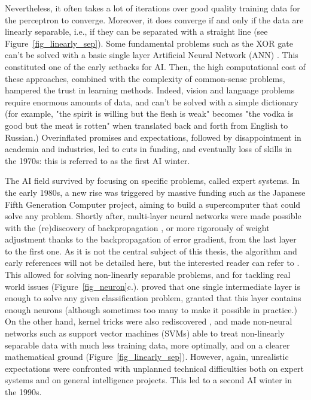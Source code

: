 Nevertheless, it often takes a lot of iterations over good quality training data for the perceptron to converge. Moreover, it does converge if and only if the data are linearly separable, i.e., if they can be separated with a straight line \cite{Novikoff1963} (see Figure~\ref{fig_linearly_sep}). Some fundamental problems such as the XOR gate can't be solved with a basic single layer Artificial Neural Network (ANN) \cite{Minsky1969}. This constituted one of the early setbacks for AI. Then, the high computational cost of these approaches, combined with the complexity of common-sense problems, hampered the trust in learning methods. Indeed, vision and language problems require enormous amounts of data, and can't be solved with a simple dictionary (for example, "the spirit is willing but the flesh is weak" becomes "the vodka is good but the meat is rotten" when translated back and forth from English to Russian.) Overinflated promises and expectations, followed by disappointment in academia and industries, led to cuts in funding, and eventually loss of skills in the 1970s: this is referred to as the first AI winter.

The AI field survived by focusing on specific problems, called expert systems. In the early 1980s, a new rise was triggered by massive funding such as the Japanese Fifth Generation Computer project, aiming to build a supercomputer that could solve any problem. Shortly after, multi-layer neural networks were made possible with the (re)discovery of backpropagation \cite{Rumelhart1986}, or more rigorously of weight adjustment thanks to the backpropagation of error gradient, from the last layer to the first one. As it is not the central subject of this thesis, the algorithm and early references will not be detailed here, but the interested reader can refer to \cite{Goodfellow2016}. This allowed for solving non-linearly separable problems, and for tackling real world issues (Figure~\ref{fig_neuron}c.). \cite{Cybenko1989} proved that one single intermediate layer is enough to solve any given classification problem, granted that this layer contains enough neurons (although sometimes too many to make it possible in practice.) On the other hand, kernel tricks were also rediscovered \cite{Aizerman1964,Hofmann2008}, and made non-neural networks such as support vector machines (SVMs) \cite{Boser1992} able to treat non-linearly separable data with much less training data, more optimally, and on a clearer mathematical ground (Figure~\ref{fig_linearly_sep}). However, again, unrealistic expectations were confronted with unplanned technical difficulties both on expert systems and on general intelligence projects. This led to a second AI winter in the 1990s. 


